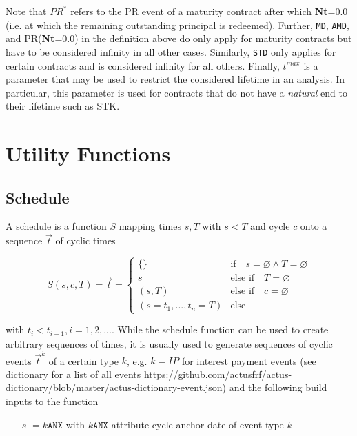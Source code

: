 \documentclass[9pt,oneside]{amsart}
\newcommand{\attr}[1]{\texttt{#1}}
\newcommand{\sdl}[3]{S(#1,#2,#3)}
\newcommand{\undef}{\varnothing}
\newcommand{\tmax}{t^{max}}
\begin{document}
\begin{multicols}{2}
Note that $PR^*$ refers to the PR event of a maturity contract after which \textbf{Nt}=0.0 (i.e. at which the remaining outstanding principal is redeemed). Further, \attr{MD}, \attr{AMD}, and PR(\textbf{Nt}=0.0) in the definition above do only apply for maturity contracts but have to be considered infinity in all other cases. Similarly, \attr{STD} only applies for certain contracts and is considered infinity for all others. Finally, $\tmax$ is a parameter that may be used to restrict the considered lifetime in an analysis. In particular, this parameter is used for contracts that do not have a \textit{natural} end to their lifetime such as STK.



\section{Utility Functions}\label{sec:utils}


\subsection{Schedule}\label{sec:schedule}

A schedule is a function $S$ mapping times $s,T$ with $s<T$ and cycle $c$ onto a sequence $\vec{t}$ of cyclic times

\[
	\sdl{s}{c}{T}=\vec{t}=\begin{cases} \{\} & \text{if}\quad s=\undef\land T=\undef\\
					s & \text{else if}\quad T=\undef\\
					(s,T) & \text{else if}\quad c=\undef\\
					(s=t_1,...,t_n=T) & \text{else} \end{cases}
\]

with $t_i<t_{i+1}, i=1,2,...$. While the schedule function can be used to create arbitrary sequences of times, it is usually used to generate sequences of cyclic events $\vec{t}^k$ of a certain type $k$, e.g. $k=IP$ for interest payment events (see dictionary for a list of all events https://github.com/actusfrf/actus-dictionary/blob/master/actus-dictionary-event.json) and the following build inputs to the function

\begin{itemize}
	\item[$s$] $=k\attr{ANX}$ with $k\attr{ANX}$ attribute cycle anchor date of event type $k$


\end{itemize}
\end{multicols}
\end{document}
